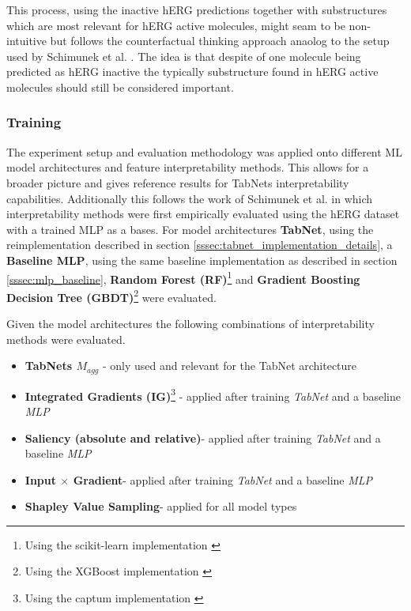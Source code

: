 \documentclass[../main.tex]{subfiles}
\begin{document}
This process, using the inactive hERG predictions together with substructures which are most relevant for hERG active molecules, might seam to be non-intuitive but follows the counterfactual thinking approach anaolog to the setup used by Schimunek et al. \cite{schimunek_poster_2021}. The idea is that despite of one molecule being predicted as hERG inactive the typically substructure found in hERG active molecules should still be considered important. 

\subsubsection{Training}

The experiment setup and evaluation methodology was applied onto different ML model architectures and feature interpretability methods. This allows for a broader picture and gives reference results for TabNets interpretability capabilities. Additionally this follows the work of Schimunek et al. \cite{schimunek_poster_2021} in which interpretability methods were first empirically evaluated using the hERG dataset with a trained MLP as a bases.
For model architectures \textbf{TabNet}, using the reimplementation described in section \ref{sssec:tabnet_implementation_details}, a \textbf{Baseline MLP}, using the same baseline implementation as described in section \ref{sssec:mlp_baseline}, \textbf{Random Forest (RF)}\footnote{Using the scikit-learn implementation \cite{scikit-learn}} and \textbf{Gradient Boosting Decision Tree (GBDT)}\footnote{Using the XGBoost implementation \cite{chen_xgboost_2016}} were evaluated.

Given the model architectures the following combinations of interpretability methods were evaluated.

\begin{itemize}
	\item \textbf{TabNets $M_{agg}$} - only used and relevant for the TabNet architecture
	\item \textbf{Integrated Gradients (IG)}\footnote{Using the captum implementation \cite{kokhlikyan2020captum}} - applied after training \emph{TabNet} and a baseline \emph{MLP}
	\item \textbf{Saliency (absolute and relative)}\footnotemark[\value{footnote}] - applied after training \emph{TabNet} and a baseline \emph{MLP}
	\item \textbf{Input $\times$ Gradient}\footnotemark[\value{footnote}] - applied after training \emph{TabNet} and a baseline \emph{MLP}
	\item \textbf{Shapley Value Sampling}\footnotemark[\value{footnote}] - applied for all model types
	

\end{itemize}
\end{document}
